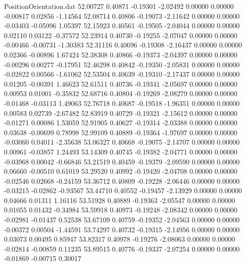 \begin{filecontents}{PositionOrientation.dat}
  52.00727    0.40871   -0.19301    -2.02492    0.00000    0.00000   -0.00817    0.02856   -1.14564
  52.08714    0.40806   -0.19073    -2.11642    0.00000    0.00000   -0.03403   -0.05996    1.05397
  52.15923    0.40561   -0.19505    -2.04044    0.00000    0.00000    0.02110    0.03122   -0.37572
  52.23914    0.40730   -0.19255    -2.07047    0.00000    0.00000   -0.00466   -0.00731   -1.30383
  52.31116    0.40696   -0.19308    -2.16437    0.00000    0.00000    0.02366   -0.00896    1.67424
  52.38308    0.40866   -0.19373    -2.04397    0.00000    0.00000   -0.00296    0.00277   -0.17951
  52.46298    0.40842   -0.19350    -2.05831    0.00000    0.00000   -0.02822    0.00566   -1.61062
  52.53504    0.40639   -0.19310    -2.17437    0.00000    0.00000    0.01205   -0.00391    1.46623
  52.61511    0.40736   -0.19341    -2.05697    0.00000    0.00000    0.00953    0.01001   -0.35832
  52.68716    0.40804   -0.19269    -2.08279    0.00000    0.00000   -0.01468   -0.03113    1.49063
  52.76718    0.40687   -0.19518    -1.96351    0.00000    0.00000    0.00583    0.02739   -2.67482
  52.83919    0.40729   -0.19321    -2.15612    0.00000    0.00000   -0.01271    0.00086    1.53059
  52.91905    0.40627   -0.19314    -2.03388    0.00000    0.00000    0.03638   -0.00699    0.78998
  52.99109    0.40889   -0.19364    -1.97697    0.00000    0.00000   -0.03060    0.04011   -2.35638
  53.06327    0.40668   -0.19075    -2.14707    0.00000    0.00000    0.00961   -0.03857    1.24493
  53.14309    0.40745   -0.19382    -2.04771    0.00000    0.00000   -0.03968    0.00042   -0.66846
  53.21519    0.40459   -0.19379    -2.09590    0.00000    0.00000    0.06660   -0.00510    0.61019
  53.29520    0.40992   -0.19420    -2.04708    0.00000    0.00000   -0.02546    0.02668   -0.24159
  53.36712    0.40809   -0.19228    -2.06446    0.00000    0.00000   -0.03215   -0.02862   -0.93567
  53.44710    0.40552   -0.19457    -2.13929    0.00000    0.00000    0.04666    0.01311    1.16116
  53.51928    0.40889   -0.19363    -2.05547    0.00000    0.00000    0.01055    0.01432   -0.34984
  53.59918    0.40973   -0.19248    -2.08342    0.00000    0.00000   -0.02981   -0.01437    0.52538
  53.67109    0.40759   -0.19352    -2.04563    0.00000    0.00000   -0.00372    0.00504   -1.44591
  53.74297    0.40732   -0.19315    -2.14956    0.00000    0.00000    0.03073    0.00495    0.85947
  53.82317    0.40978   -0.19276    -2.08063    0.00000    0.00000   -0.02814   -0.00859    0.11235
  53.89515    0.40776   -0.19337    -2.07254    0.00000    0.00000   -0.01869   -0.00715    0.30017

\end{filecontents}
